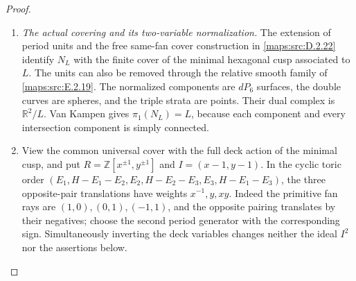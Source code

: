 \begin{proof}
\begin{enumerate}[label=\arabic*.,leftmargin=*]
\item \emph{The actual covering and its two-variable normalization.}
The extension of period units and the free same-fan
cover construction in \ref{maps:src:D.2.22} identify $N_L$ with
the finite cover of the minimal hexagonal cusp
associated to $L$. The units can also be removed
through the relative smooth family of \ref{maps:src:E.2.19}.
The normalized components are $dP_6$ surfaces,
the double curves are spheres, and the triple
strata are points. Their dual complex is
$\mathbb R^2/L$. Van Kampen gives
$\pi_1(N_L)=L$, because each component and every
intersection component is simply connected.

\item View the common universal cover with the full deck
action of the minimal cusp, and put
$R=\mathbb Z[x^{\pm1},y^{\pm1}]$ and
$I=(x-1,y-1)$. In the cyclic toric order
$(E_1,H-E_1-E_2,E_2,H-E_2-E_3,E_3,H-E_1-E_3)$,
the three opposite-pair translations have
weights $x^{-1},y,xy$. Indeed the primitive
fan rays are $(1,0),(0,1),(-1,1)$, and the
opposite pairing translates by their negatives;
choose the second period generator with the
corresponding sign. Simultaneously inverting
the deck variables changes neither the ideal
$I^2$ nor the assertions below.


\end{enumerate}
\end{proof}
